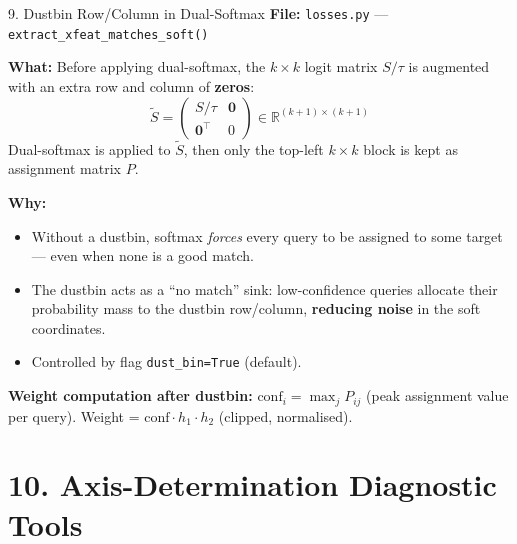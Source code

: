 \documentclass[aspectratio=169, 12pt]{beamer}
\newcommand{\R}{\mathbb{R}}
\begin{document}
\begin{frame}{9. Dustbin Row/Column in Dual-Softmax}
\small
\textbf{File:} \texttt{losses.py} --- \texttt{extract\_xfeat\_matches\_soft()}

\medskip
\textbf{What:} Before applying dual-softmax, the $k \times k$ logit matrix
$S/\tau$ is augmented with an extra row and column of \textbf{zeros}:
\[
    \tilde{S} = \begin{pmatrix} S/\tau & \mathbf{0} \\ \mathbf{0}^\top & 0 \end{pmatrix}
    \in \R^{(k{+}1) \times (k{+}1)}
\]
Dual-softmax is applied to $\tilde{S}$, then only the top-left $k \times k$
block is kept as assignment matrix $P$.

\medskip
\textbf{Why:}
\begin{itemize}\setlength{\itemsep}{2pt}
    \item Without a dustbin, softmax \emph{forces} every query to be assigned
          to some target --- even when none is a good match.
    \item The dustbin acts as a ``no match'' sink: low-confidence queries
          allocate their probability mass to the dustbin row/column,
          \textbf{reducing noise} in the soft coordinates.
    \item Controlled by flag \texttt{dust\_bin=True} (default).
\end{itemize}

\medskip
\textbf{Weight computation after dustbin:}
$\mathrm{conf}_i = \max_j P_{ij}$ (peak assignment value per query).
Weight = $\mathrm{conf} \cdot h_1 \cdot h_2$ (clipped, normalised).
\end{frame}


\section{10. Axis-Determination Diagnostic Tools}
\end{document}
